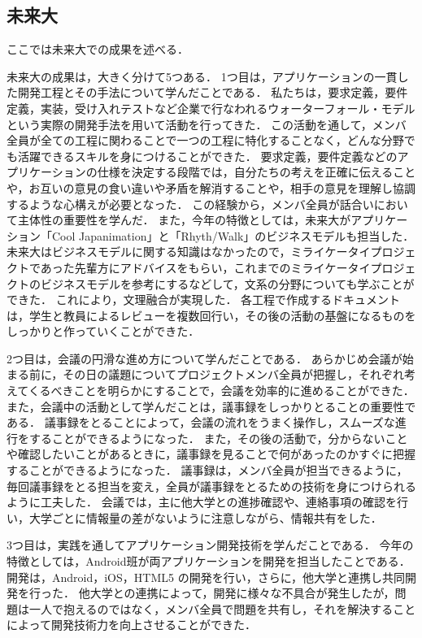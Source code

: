 \subsection{未来大}
\par
ここでは未来大での成果を述べる．
\par
未来大の成果は，大きく分けて5つある．
1つ目は，アプリケーションの一貫した開発工程とその手法について学んだことである．
私たちは，要求定義，要件定義，実装，受け入れテストなど企業で行なわれるウォーターフォール・モデルという実際の開発手法を用いて活動を行ってきた．
この活動を通して，メンバ全員が全ての工程に関わることで一つの工程に特化することなく，どんな分野でも活躍できるスキルを身につけることができた．
要求定義，要件定義などのアプリケーションの仕様を決定する段階では，自分たちの考えを正確に伝えることや，お互いの意見の食い違いや矛盾を解消することや，相手の意見を理解し協調するような心構えが必要となった．
この経験から，メンバ全員が話合いにおいて主体性の重要性を学んだ．
また，今年の特徴としては，未来大がアプリケーション「Cool Japanimation」と「Rhyth/Walk」のビジネスモデルも担当した．
未来大はビジネスモデルに関する知識はなかったので，ミライケータイプロジェクトであった先輩方にアドバイスをもらい，これまでのミライケータイプロジェクトのビジネスモデルを参考にするなどして，文系の分野についても学ぶことができた．
これにより，文理融合が実現した．
各工程で作成するドキュメントは，学生と教員によるレビューを複数回行い，その後の活動の基盤になるものをしっかりと作っていくことができた．
\par
2つ目は，会議の円滑な進め方について学んだことである．
あらかじめ会議が始まる前に，その日の議題についてプロジェクトメンバ全員が把握し，それぞれ考えてくるべきことを明らかにすることで，会議を効率的に進めることができた．
また，会議中の活動として学んだことは，議事録をしっかりとることの重要性である．
議事録をとることによって，会議の流れをうまく操作し，スムーズな進行をすることができるようになった．
また，その後の活動で，分からないことや確認したいことがあるときに，議事録を見ることで何があったのかすぐに把握することができるようになった．
議事録は，メンバ全員が担当できるように，毎回議事録をとる担当を変え，全員が議事録をとるための技術を身につけられるように工夫した．
会議では，主に他大学との進捗確認や、連絡事項の確認を行い，大学ごとに情報量の差がないように注意しながら、情報共有をした．
\par
3つ目は，実践を通してアプリケーション開発技術を学んだことである．
今年の特徴としては，Android班が両アプリケーションを開発を担当したことである．
開発は，Android，iOS，HTML5 の開発を行い，さらに，他大学と連携し共同開発を行った．
他大学との連携によって，開発に様々な不具合が発生したが，問題は一人で抱えるのではなく，メンバ全員で問題を共有し，それを解決することによって開発技術力を向上させることができた．
